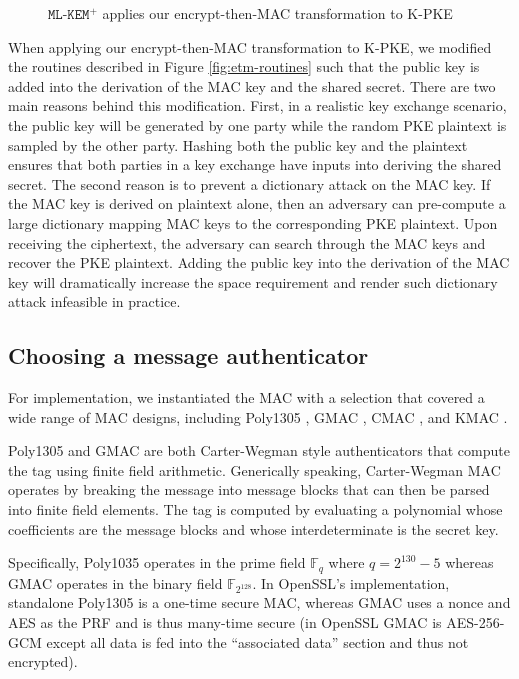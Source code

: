 \documentclass[journal=tches,submission]{iacrtrans}
\begin{document}
\begin{figure}[h]
    \caption{$\texttt{ML-KEM}^+$ applies our encrypt-then-MAC transformation to K-PKE}\label{fig:ml-kem-plus-routines}
\end{figure}

When applying our encrypt-then-MAC transformation to K-PKE, we modified the routines described in Figure \ref{fig:etm-routines} such that the public key is added into the derivation of the MAC key and the shared secret. There are two main reasons behind this modification. First, in a realistic key exchange scenario, the public key will be generated by one party while the random PKE plaintext is sampled by the other party. Hashing both the public key and the plaintext ensures that both parties in a key exchange have inputs into deriving the shared secret. The second reason is to prevent a dictionary attack on the MAC key. If the MAC key is derived on plaintext alone, then an adversary can pre-compute a large dictionary mapping MAC keys to the corresponding PKE plaintext. Upon receiving the ciphertext, the adversary can search through the MAC keys and recover the PKE plaintext. Adding the public key into the derivation of the MAC key will dramatically increase the space requirement and render such dictionary attack infeasible in practice.

\subsection{Choosing a message authenticator}\label{sec:choosing-a-message-authenticator}
For implementation, we instantiated the MAC with a selection that covered a wide range of MAC designs, including Poly1305 \cite{bernstein2005poly1305}, GMAC \cite{mcgrew2004galois}, CMAC \cite{iwata2003omac}\cite{black2000cbc}, and KMAC \cite{SP80053r4}.

Poly1305 and GMAC are both Carter-Wegman style authenticators \cite{wegman1981new} that compute the tag using finite field arithmetic. Generically speaking, Carter-Wegman MAC operates by breaking the message into message blocks that can then be parsed into finite field elements. The tag is computed by evaluating a polynomial whose coefficients are the message blocks and whose interdeterminate is the secret key.

Specifically, Poly1035 operates in the prime field $\mathbb{F}_q$ where $q = 2^{130} - 5$ whereas GMAC operates in the binary field $\mathbb{F}_{2^{128}}$. In OpenSSL's implementation, standalone Poly1305 is a one-time secure MAC, whereas GMAC uses a nonce and AES as the PRF and is thus many-time secure (in OpenSSL GMAC is AES-256-GCM except all data is fed into the ``associated data'' section and thus not encrypted).
\end{document}
